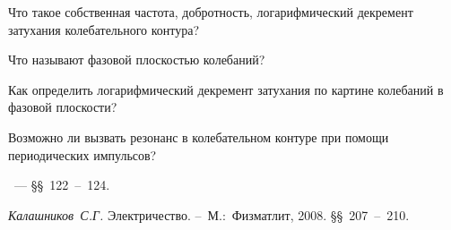 \begin{lab:questions}
	\item Что такое собственная частота, добротность, логарифмический декремент
затухания колебательного контура?
	\item Что называют фазовой плоскостью колебаний?
	\item  Как определить логарифмический декремент затухания по картине
колебаний в фазовой плоскости?
	\item  Возможно ли вызвать резонанс в колебательном контуре при помощи
периодических импульсов?
\end{lab:questions}


\begin{lab:literature}

	\item \SivuhinIII~--- \S\S~122~--~124.

	\item \textit{Калашников~С.Г.} Электричество. --~М.:~Физматлит, 2008.
\S\S~207~--~210.

\end{lab:literature}
